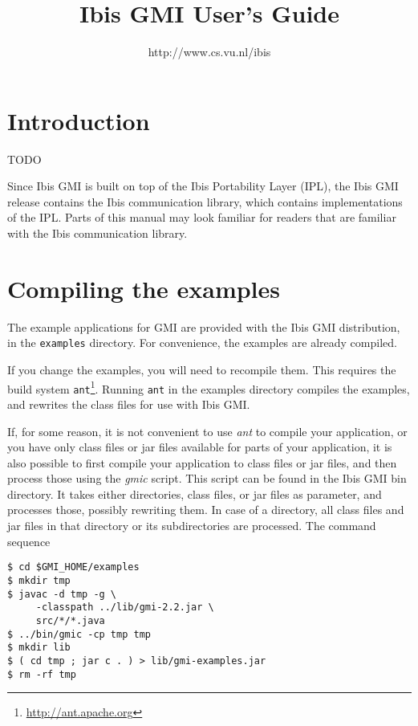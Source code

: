 \documentclass[a4paper,10pt]{article}
\begin{document}
\title{Ibis GMI User's Guide}

\author{http://www.cs.vu.nl/ibis}

\maketitle

\section{Introduction}

TODO

Since Ibis GMI is built on top of the Ibis Portability Layer (IPL),
the Ibis GMI release contains the Ibis communication library, which contains
implementations of the IPL. Parts of this manual may look familiar for
readers that are familiar with the Ibis communication library.

\section{Compiling the examples}

The example applications for GMI are
provided with the Ibis GMI distribution, in the \texttt{examples} directory.
For convenience, the examples are already compiled.

If you change the examples, you will need to recompile them. This
requires the build system \texttt{ant}\footnote{\url{http://ant.apache.org}}.
Running \texttt{ant} in the examples directory compiles the examples,
and rewrites the class files for use with Ibis GMI.

If, for some reason, it is not convenient to use \emph{ant} to compile
your application, or you have only class files or jar files available
for parts of your application, it is also possible to first compile
your application to class files or jar files, and then process those
using the \emph{gmic} script. This script can be found in the Ibis GMI
bin directory. It takes either directories, class files, or jar files
as parameter, and processes those, possibly rewriting them. In case
of a directory, all class files and jar files in that directory or
its subdirectories are processed.  The command sequence

\begin{verbatim}
$ cd $GMI_HOME/examples
$ mkdir tmp
$ javac -d tmp -g \
     -classpath ../lib/gmi-2.2.jar \
     src/*/*.java
$ ../bin/gmic -cp tmp tmp
$ mkdir lib
$ ( cd tmp ; jar c . ) > lib/gmi-examples.jar
$ rm -rf tmp
\end{verbatim}
\end{document}
